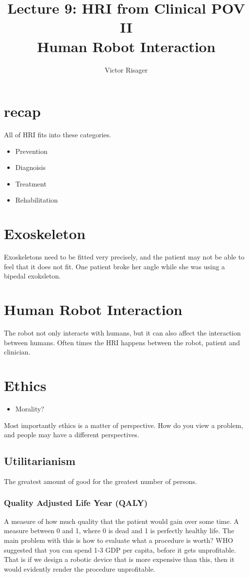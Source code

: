 \documentclass[a4paper]{article}
\title{Lecture 9: HRI from Clinical POV II  \\
	\large Human Robot Interaction}
\author{Victor Risager}
\begin{document}
\maketitle
\section{recap}

All of HRI fits into these categories. 
\begin{itemize}
	\item Prevention
	\item Diagnoisis
	\item Treatment
	\item Rehabilitation
\end{itemize}

\section{Exoskeleton}
Exoskeletons need to be fitted very precisely, and the patient may not be able to feel that it does not fit. One patient broke her angle while she was using a bipedal exoksleton.


\section{Human Robot Interaction}
The robot not only interacts with humans, but it can also affect the interaction between humans. Often times the HRI happens between the robot, patient and clinician.


\section{Ethics}
\begin{itemize}
	\item Morality? 
\end{itemize}

Most importantly ethics is a matter of perspective. How do you view a problem, and people may have a different perspectives. 

\subsection{Utilitarianism}
The greatest amount of good for the greatest number of persons.

\subsubsection{Quality Adjusted Life Year (QALY)}
A measure of how much quality that the patient would gain over some time. A measure between 0 and 1, where 0 is dead and 1 is perfectly healthy life. The main problem with this is how to evaluate what a procedure is worth?  WHO suggested that you can spend 1-3 GDP per capita, before it gets unprofitable. That is if we design a robotic device that is more expensive than this, then it would evidently render the procedure unprofitable. 
\end{document}
